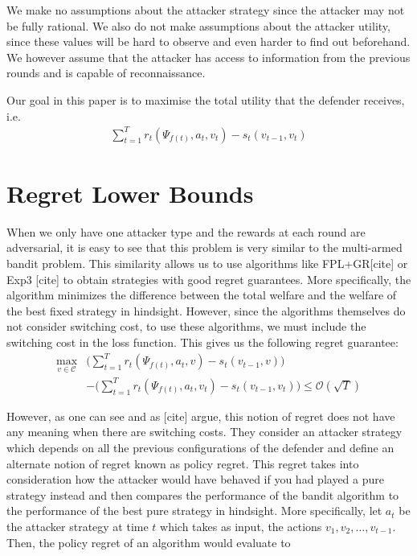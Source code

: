 \documentclass[sigconf]{aamas}  %
\newcommand{\cal}[1]{\mathcal{#1}}
\theoremstyle{definition}
\theoremstyle{definition}
\begin{document}
We make no assumptions about the attacker strategy since the attacker may not be fully rational. We also do not make assumptions about the attacker utility, since these values will be hard to observe and even harder to find out beforehand. We however assume that the attacker has access to information from the previous rounds and is capable of reconnaissance.

Our goal in this paper is to maximise the total utility that the defender receives, i.e.
\begin{align*}
    \sum_{t=1}^T r_t(\Psi_{f(t)}, a_t, v_t) - s_t(v_{t-1}, v_t)
\end{align*}

\section{Regret Lower Bounds}\label{sec:lower-bounds}
When we only have one attacker type and the rewards at each round are adversarial, it is easy to see that this problem is very similar to the multi-armed bandit problem. This similarity allows us to use algorithms like FPL+GR[cite] or Exp3 [cite] to obtain strategies with good regret guarantees. More specifically, the algorithm minimizes the difference between the total welfare and the welfare of the best fixed strategy in hindsight. However, since the algorithms themselves do not consider switching cost, to use these algorithms, we must include the switching cost in the loss function. This gives us the following regret guarantee:
\begin{align*}
    \max_{v \in \cal C} & \bigg (\sum_{t=1}^T r_t(\Psi_{f(t)}, a_t, v) - s_t(v_{t-1}, v) \bigg ) \\
    & - \bigg ( \sum_{t=1}^T r_t(\Psi_{f(t)}, a_t, v_t) - s_t(v_{t-1}, v_t) \bigg ) 
    \le \cal O(\sqrt{T})
\end{align*}

However, as one can see and as [cite] argue, this notion of regret does not have any meaning when there are switching costs. They consider an attacker strategy which depends on all the previous configurations of the defender and define an alternate notion of regret known as policy regret. This regret takes into consideration how the attacker would have behaved if you had played a pure strategy instead and then compares the performance of the bandit algorithm to the performance of the best pure strategy in hindsight. More specifically, let $a_t$ be the attacker strategy at time $t$ which takes as input, the actions $v_1, v_2, \dots, v_{t-1}$. Then, the policy regret of an algorithm would evaluate to
\end{document}
